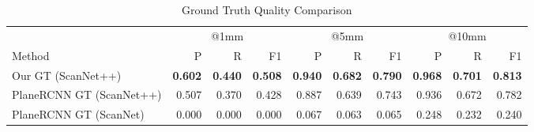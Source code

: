 \begin{table}[t]
\centering
\caption{Ground Truth Quality Comparison}
\label{tab:gt_quality}
\begin{tabular}{l r r r r r r r r r}
\toprule
\multicolumn{1}{l}{} & \multicolumn{3}{c}{@1mm} & \multicolumn{3}{c}{@5mm} & \multicolumn{3}{c}{@10mm} \\
\cmidrule(lr){2-4} \cmidrule(lr){5-7} \cmidrule(lr){8-10}
Method & P & R & F1 & P & R & F1 & P & R & F1 \\
\midrule
Our GT (ScanNet++) & \textbf{0.602} & \textbf{0.440} & \textbf{0.508} & \textbf{0.940} & \textbf{0.682} & \textbf{0.790} & \textbf{0.968} & \textbf{0.701} & \textbf{0.813} \\
PlaneRCNN GT (ScanNet++) & 0.507 & 0.370 & 0.428 & 0.887 & 0.639 & 0.743 & 0.936 & 0.672 & 0.782 \\
PlaneRCNN GT (ScanNet) & 0.000 & 0.000 & 0.000 & 0.067 & 0.063 & 0.065 & 0.248 & 0.232 & 0.240 \\
\bottomrule
\end{tabular}
\end{table}